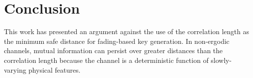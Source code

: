 \documentclass[conference]{ieeetran}
\begin{document}
\section{Conclusion}
This work has presented an argument against the use of the correlation length as the minimum safe distance for fading-based key generation.  In non-ergodic channels, mutual information can persist over greater distances than the correlation length because the channel is a deterministic function of slowly-varying physical features.  

{}
\end{document}
